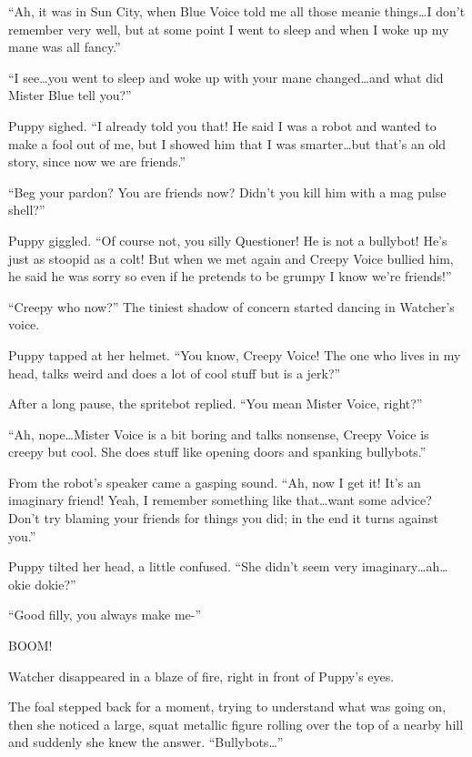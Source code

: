 ``Ah, it was in Sun City, when Blue Voice told me all those meanie things\dots I don't remember very well, but at some point I went to sleep and when I woke up my mane was all fancy.''

``I see\dots you went to sleep and woke up with your mane changed\dots and what did Mister Blue tell you?''

Puppy sighed. ``I already told you that! He said I was a robot and wanted to make a fool out of me, but I showed him that I was smarter\dots but that's an old story, since now we are friends.''

``Beg your pardon? You are friends now? Didn't you kill him with a mag pulse shell?''

Puppy giggled. ``Of course not, you silly Questioner! He is not a bullybot! He's just as stoopid as a colt! But when we met again and Creepy Voice bullied him, he said he was sorry so even if he pretends to be grumpy I know we're friends!''

``Creepy who now?'' The tiniest shadow of concern started dancing in Watcher's voice.

Puppy tapped at her helmet. ``You know, Creepy Voice! The one who lives in my head, talks weird and does a lot of cool stuff but is a jerk?''

After a long pause, the spritebot replied. ``You mean Mister Voice, right?''

``Ah, nope\dots Mister Voice is a bit boring and talks nonsense, Creepy Voice is creepy but cool. She does stuff like opening doors and spanking bullybots.''

From the robot's speaker came a gasping sound. ``Ah, now I get it! It's an imaginary friend! Yeah, I remember something like that\dots want some advice? Don't try blaming your friends for things you did; in the end it turns against you.''

Puppy tilted her head, a little confused. ``She didn't seem very imaginary\dots ah\dots okie dokie?''

``Good filly, you always make me-''

BOOM!

Watcher disappeared in a blaze of fire, right in front of Puppy's eyes.

The foal stepped back for a moment, trying to understand what was going on, then she noticed a large, squat metallic figure rolling over the top of a nearby hill and suddenly she knew the answer. ``Bullybots\dots''

\horizonline

